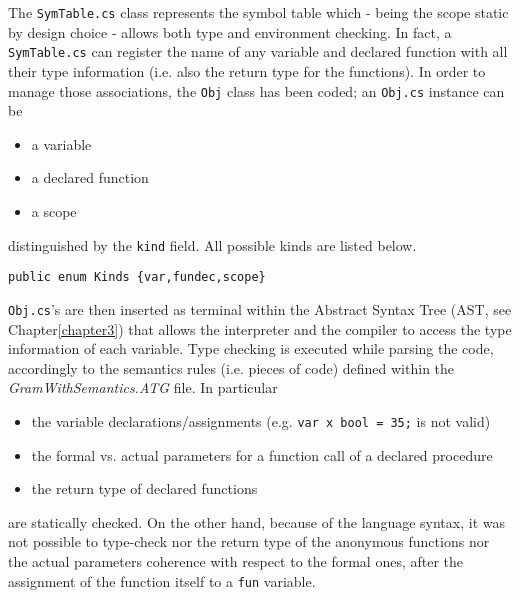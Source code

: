 The \texttt{SymTable.cs} class represents the \fwap symbol table which - being the scope static by design choice - allows both type and environment checking. In fact, a \texttt{SymTable.cs} can register the name of any variable and declared function with all their type information (i.e. also the return type for the functions). In order to manage those associations, the \texttt{Obj} class has been coded; an \texttt{Obj.cs} instance can be

\begin{itemize}
	\item a variable
	\item a declared function
	\item a scope
\end{itemize}

distinguished by the \texttt{kind} field. All possible kinds are listed below.

\begin{lstlisting}[caption=Labels for \texttt{Node}'s.]
public enum Kinds {var,fundec,scope}
\end{lstlisting}

\texttt{Obj.cs}'s are then inserted as terminal within the Abstract Syntax Tree (AST, see Chapter\ref{chapter3}) that allows the interpreter and the compiler to access the type information of each variable. Type checking is executed while parsing the \fwap code, accordingly to the semantics rules (i.e. pieces of code) defined within the \textit{GramWithSemantics.ATG} file. In particular
\begin{itemize}
	\item the variable declarations/assignments (e.g. \texttt{var x bool = 35;} is not valid)
	\item the formal vs. actual parameters for a function call of a declared procedure
	\item the return type of declared functions 
\end{itemize}
are statically checked. On the other hand, because of the language syntax, it was not possible to type-check nor the return type of the anonymous functions nor the actual parameters coherence with respect to the formal ones, after the assignment of the function itself to a \texttt{fun} variable.

